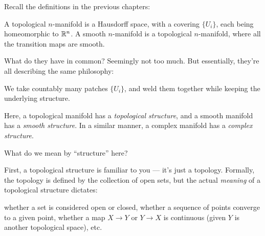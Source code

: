 Recall the definitions in the previous chapters:
\begin{itemize}
	\ii A topological $n$-manifold is a Hausdorff space, with a covering $\{ U_i \}$, each being
	homeomorphic to $\mathbb R^n$.
	\ii A smooth $n$-manifold is a topological $n$-manifold, where all the transition maps are
	smooth.
\end{itemize}
What do they have in common? Seemingly not too much. But essentially, they're all describing the
same philosophy:
\begin{moral}
	We take countably many patches $\{ U_i \}$, and weld them together while keeping the underlying
	structure.
\end{moral}

Here, a topological manifold has a \emph{topological structure}, and a smooth manifold has a
\emph{smooth structure}. In a similar manner, a complex manifold has a \emph{complex structure}.

What do we mean by ``structure'' here?

First, a topological structure is familiar to you --- it's just a topology.
Formally, the topology is defined by the collection of open sets, but the actual \emph{meaning} of a
topological structure dictates:
\begin{itemize}
	\ii whether a set is considered open or closed,
	\ii whether a sequence of points converge to a given point,
	\ii whether a map $X \to Y$ or $Y \to X$ is continuous (given $Y$ is another topological space),
	\ii etc.
\end{itemize}

